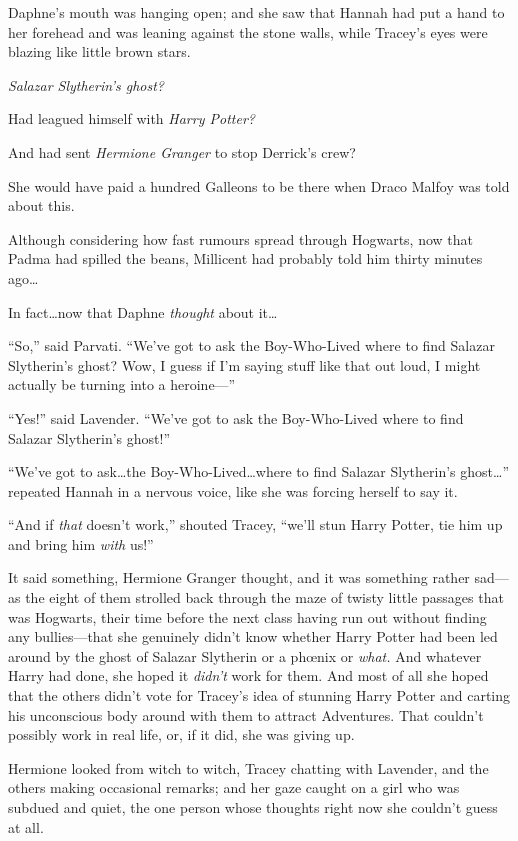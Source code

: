 Daphne’s mouth was hanging open; and she saw that Hannah had put a hand to her forehead and was leaning against the stone walls, while Tracey’s eyes were blazing like little brown stars.

\emph{Salazar Slytherin’s ghost?}

Had leagued himself with \emph{Harry Potter?}

And had sent \emph{Hermione Granger} to stop Derrick’s crew?

She would have paid a hundred Galleons to be there when Draco Malfoy was told about this.

Although considering how fast rumours spread through Hogwarts, now that Padma had spilled the beans, Millicent had probably told him thirty minutes ago…

In fact…now that Daphne \emph{thought} about it…

“So,” said Parvati. “We’ve got to ask the Boy-Who-Lived where to find Salazar Slytherin’s ghost? Wow, I guess if I’m saying stuff like that out loud, I might actually be turning into a heroine—”

“Yes!” said Lavender. “We’ve got to ask the Boy-Who-Lived where to find Salazar Slytherin’s ghost!”

“We’ve got to ask…the Boy-Who-Lived…where to find Salazar Slytherin’s ghost…” repeated Hannah in a nervous voice, like she was forcing herself to say it.

“And if \emph{that} doesn’t work,” shouted Tracey, “we’ll stun Harry Potter, tie him up and bring him \emph{with} us!”

\later

It said something, Hermione Granger thought, and it was something rather sad—as the eight of them strolled back through the maze of twisty little passages that was Hogwarts, their time before the next class having run out without finding any bullies—that she genuinely didn’t know whether Harry Potter had been led around by the ghost of Salazar Slytherin or a phœnix or \emph{what.} And whatever Harry had done, she hoped it \emph{didn’t} work for them. And most of all she hoped that the others didn’t vote for Tracey’s idea of stunning Harry Potter and carting his unconscious body around with them to attract Adventures. That couldn’t possibly work in real life, or, if it did, she was giving up.

Hermione looked from witch to witch, Tracey chatting with Lavender, and the others making occasional remarks; and her gaze caught on a girl who was subdued and quiet, the one person whose thoughts right now she couldn’t guess at all.

